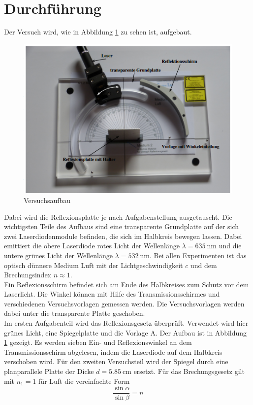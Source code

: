 \section{Durchführung}
\label{sec:Durchführung}
Der Versuch wird, wie in Abbildung \ref{fig:aufb} zu sehen ist, aufgebaut.
\begin{figure}
    \centering
    \caption{Versuchsaufbau \cite{V400}}
    \label{fig:aufb}
    \includegraphics[width = 0.6 \textwidth]{pics/aufb.png}
\end{figure}
Dabei wird die Reflexionsplatte je nach Aufgabenstellung ausgetauscht.
Die wichtigsten Teile des Aufbaus sind eine transparente Grundplatte auf der sich zwei Laserdiodenmodule befinden, die sich im Halbkreis bewegen lassen.
Dabei emittiert die obere Laserdiode rotes Licht der Wellenlänge $\lambda = \SI{635}{\nano \meter}$ und die untere grünes Licht der Wellenlänge $\lambda=\SI{532}{\nano \meter}$.
Bei allen Experimenten ist das optisch dünnere Medium Luft mit der Lichtgeschwindigkeit $c$ und dem Brechungsindex $n \approx 1$.\\
Ein Reflexionsschirm befindet sich am Ende des Halbkreises zum Schutz vor dem Laserlicht. Die Winkel können mit Hilfe des Transmissionsschirmes und verschiedenen Versuchsvorlagen gemessen werden.
Die Versuchsvorlagen werden dabei unter die transparente Platte geschoben.\\
Im ersten Aufgabenteil wird das Reflexionsgesetz überprüft. Verwendet wird hier grünes Licht, eine Spiegelplatte und die Vorlage A.
Der Aufbau ist in Abbildung \ref{fig:aufb} gezeigt. Es werden sieben Ein- und Reflexionswinkel an dem Transmissionsschirm abgelesen, indem die Laserdiode auf dem Halbkreis verschoben wird.
Für den zweiten Versuchsteil wird der Spiegel durch eine planparallele Platte der Dicke $d=\SI{5.85}{\centi\metre}$ ersetzt. Für das Brechungsgesetz gilt mit $n_1=1$ für Luft die vereinfachte Form
\begin{equation}
    \frac{\sin \alpha}{\sin \beta} = n
    \label{eqn:index}
\end{equation}
